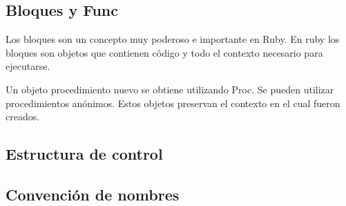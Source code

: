 \documentclass{article}
\begin{document}
 
\bigskip

 
\bigskip

 
\bigskip

\subsection{Bloques y Func}

Los bloques son un concepto muy poderoso e importante en Ruby. En ruby los bloques son objetos que contienen código y todo el contexto necesario para ejecutarse.

 
\bigskip

Un objeto procedimiento nuevo se obtiene utilizando Proc. Se pueden utilizar procedimientos anónimos. Estos objetos preservan el contexto en el cual fueron creados.

 
\bigskip

 
\bigskip

 
\bigskip

 
\bigskip

\subsection{Estructura de control}


\bigskip

\subsection{Convención de nombres}
\end{document}
